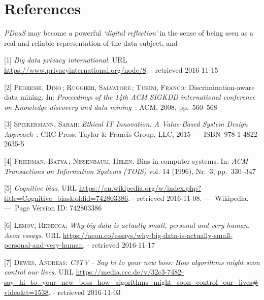 \documentclass[12pt,english,a4paper,titlepage,cleardoublepage=empty,dottedtoc]{report}
\begin{document}
\chapter*{References}\label{references}

\emph{PDaaS} may become a powerful \emph{`digital reflection'} in the
sense of being seen as a real and reliable representation of the data
subject, and

\hypertarget{refs}{}
\hypertarget{ref-web_2016_privacy-international-about-big-data}{}
{[}1{]} \emph{Big data privacy international}. URL
\url{https://www.privacyinternational.org/node/8}. - retrieved
2016-11-15

\hypertarget{ref-paper_2008_discrimination-aware-data-mining}{}
{[}2{]} \textsc{Pedreshi, Dino}\,; \textsc{Ruggieri, Salvatore}\,;
\textsc{Turini, Franco}: Discrimination-aware data mining. In:
\emph{Proceedings of the 14th ACM SIGKDD international conference on
Knowledge discovery and data mining}~: ACM, 2008, pp.~560--568

\hypertarget{ref-book_2015_ethical-it-innovation}{}
{[}3{]} \textsc{Spiekermann, Sarah}: \emph{Ethical IT Innovation: A
Value-Based System Design Approach}~: CRC Press; Taylor \& Francis
Group, LLC, 2015 ---~ISBN~978-1-4822-2635-5

\hypertarget{ref-paper_1996_bias-in-computer-systems}{}
{[}4{]} \textsc{Friedman, Batya}\,; \textsc{Nissenbaum, Helen}: Bias in
computer systems. In: \emph{ACM Transactions on Information Systems
(TOIS)} vol. 14 (1996), Nr.~3, pp.~330--347

\hypertarget{ref-wikipedia_2016_cognitive-bias}{}
{[}5{]} \emph{Cognitive bias}. URL
\url{https://en.wikipedia.org/w/index.php?title=Cognitive_bias\&oldid=742803386}.
- retrieved 2016-11-08. ---~Wikipedia. ---~Page Version ID: 742803386

\hypertarget{ref-web_2016_big-data-is-people}{}
{[}6{]} \textsc{Lemov, Rebecca}: \emph{Why big data is actually small,
personal and very human. Aeon essays}. URL
\url{https://aeon.co/essays/why-big-data-is-actually-small-personal-and-very-human}.
- retrieved 2016-11-17

\hypertarget{ref-video_2015_big-data-and-deep-learning_discrimination}{}
{[}7{]} \textsc{Dewes, Andreas}: \emph{C3TV - Say hi to your new boss:
How algorithms might soon control our lives.} URL
\url{https://media.ccc.de/v/32c3-7482-say_hi_to_your_new_boss_how_algorithms_might_soon_control_our_lives\#video\&t=1538}.
- retrieved 2016-11-03
\end{document}

